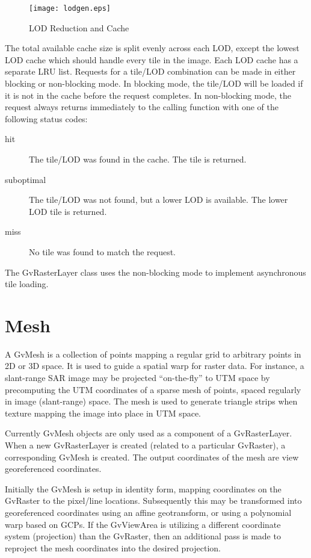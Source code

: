 \documentclass{openevreport}
\begin{document}
\begin{figure}
\centering
\texttt{[image: lodgen.eps]}
\caption{LOD Reduction and Cache}
\label{fig:lodgen}
\end{figure}

The total available cache size is split evenly across each LOD, except
the lowest LOD cache which should handle every tile in the image.
Each LOD cache has a separate LRU list.  Requests for a tile/LOD
combination can be made in either blocking or non-blocking mode.  In
blocking mode, the tile/LOD will be loaded if it is not in the cache
before the request completes.  In non-blocking mode, the request always
returns immediately to the calling function with one of the following
status codes:
\begin{description}
\item[hit] The tile/LOD was found in the cache.  The tile is
returned.
\item[suboptimal] The tile/LOD was not found, but a lower LOD is
available.  The lower LOD tile is returned.
\item[miss] No tile was found to match the request.
\end{description}
The GvRasterLayer class uses the non-blocking mode to implement
asynchronous tile loading.

\section{Mesh}

A GvMesh is a collection of points mapping a regular grid to
arbitrary points in 2D or 3D space.  It is used to guide a spatial warp
for raster data.  For instance, a slant-range SAR image may be
projected ``on-the-fly'' to UTM space by precomputing the UTM
coordinates of a sparse mesh of points, spaced regularly in image
(slant-range) space.  The mesh is used to generate triangle strips
when texture mapping the image into place in UTM space.

Currently GvMesh objects are only used as a component of a GvRasterLayer. 
When a new GvRasterLayer is created (related to a particular GvRaster), a
corresponding GvMesh is created.  The output coordinates of the mesh are
view georeferenced coordinates.  

Initially the GvMesh is setup in identity form, mapping coordinates on the
GvRaster to the pixel/line locations.  Subsequently this may be transformed
into georeferenced coordinates using an affine geotransform, or using a
polynomial warp based on GCPs.  If the GvViewArea is utilizing a different
coordinate system (projection) than the GvRaster, then an additional pass
is made to reproject the mesh coordinates into the desired projection.
\end{document}
